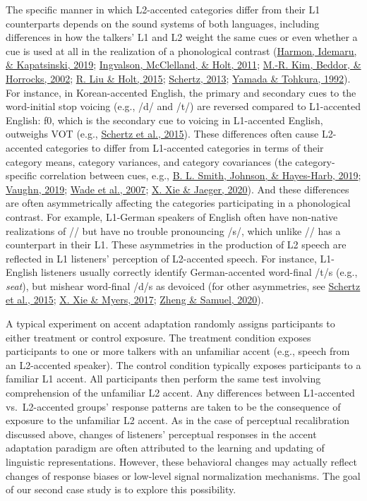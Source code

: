 \documentclass[
  11pt,
  man,floatsintext]{apa6}
\begin{document}
The specific manner in which L2-accented categories differ from their L1 counterparts depends on the sound systems of both languages, including differences in how the talkers' L1 and L2 weight the same cues or even whether a cue is used at all in the realization of a phonological contrast (\protect\hyperlink{ref-harmon2019}{Harmon, Idemaru, \& Kapatsinski, 2019}; \protect\hyperlink{ref-ingvalson2011}{Ingvalson, McClelland, \& Holt, 2011}; \protect\hyperlink{ref-kim2002}{M.-R. Kim, Beddor, \& Horrocks, 2002}; \protect\hyperlink{ref-liu-holt2015}{R. Liu \& Holt, 2015}; \protect\hyperlink{ref-schertz2013}{Schertz, 2013}; \protect\hyperlink{ref-yamada-tohkura1992}{Yamada \& Tohkura, 1992}). For instance, in Korean-accented English, the primary and secondary cues to the word-initial stop voicing (e.g., /d/ and /t/) are reversed compared to L1-accented English: f0, which is the secondary cue to voicing in L1-accented English, outweighs VOT (e.g., \protect\hyperlink{ref-schertz2015}{Schertz et al., 2015}). These differences often cause L2-accented categories to differ from L1-accented categories in terms of their category means, category variances, and category covariances (the category-specific correlation between cues, e.g., \protect\hyperlink{ref-smith2019}{B. L. Smith, Johnson, \& Hayes-Harb, 2019}; \protect\hyperlink{ref-vaughn2019}{Vaughn, 2019}; \protect\hyperlink{ref-wade2007}{Wade et al., 2007}; \protect\hyperlink{ref-xie-jaeger2020}{X. Xie \& Jaeger, 2020}). And these differences are often asymmetrically affecting the categories participating in a phonological contrast. For example, L1-German speakers of English often have non-native realizations of // but have no trouble pronouncing /s/, which unlike // has a counterpart in their L1. These asymmetries in the production of L2 speech are reflected in L1 listeners' perception of L2-accented speech. For instance, L1-English listeners usually correctly identify German-accented word-final /t/s (e.g., \emph{seat}), but mishear word-final /d/s as devoiced (for other asymmetries, see \protect\hyperlink{ref-schertz2015}{Schertz et al., 2015}; \protect\hyperlink{ref-xie2017}{X. Xie \& Myers, 2017}; \protect\hyperlink{ref-zheng-samuel2020}{Zheng \& Samuel, 2020}).

A typical experiment on accent adaptation randomly assigns participants to either treatment or control exposure. The treatment condition exposes participants to one or more talkers with an unfamiliar accent (e.g., speech from an L2-accented speaker). The control condition typically exposes participants to a familiar L1 accent.
All participants then perform the same test involving comprehension of the unfamiliar L2 accent. Any differences between L1-accented vs.~L2-accented groups' response patterns are taken to be the consequence of exposure to the unfamiliar L2 accent. As in the case of perceptual recalibration discussed above, changes of listeners' perceptual responses in the accent adaptation paradigm are often attributed to the learning and updating of linguistic representations. However, these behavioral changes may actually reflect changes of response biases or low-level signal normalization mechanisms. The goal of our second case study is to explore this possibility.
\end{document}
